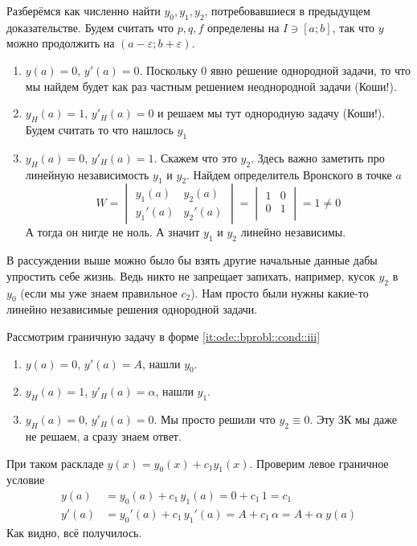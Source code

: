 \documentclass{trlnotes}
\begin{document}
Разберёмся как численно найти $y_0, y_1, y_2$, потребовавшиеся в предыдущем доказательстве.
Будем считать что $p,q,f$ определены на $I \ni [a;b]$, так что $y$ можно продолжить 
на $(a-ε;b+ε)$. 
\begin{enumerate}
  \item $y(a) = 0$, $y'(a) = 0$. Поскольку $0$ явно решение однородной задачи, то что мы
    найдем будет как раз частным решением неоднородной задачи (Коши!).
  \item $y_H(a) = 1$, $y'_H(a) = 0$ и решаем мы тут однородную задачу (Коши!). Будем считать то что
    нашлось $y_1$
  \item $y_H(a) = 0$, $y'_H(a) = 1$. Скажем что это $y_2$. Здесь важно заметить про линейную
    независимость $y_1$ и $y_2$. Найдем определитель Вронского в точке $a$
    \[
      W = \begin{vmatrix}
        y_1(a) & y_2(a) \\
        y_1'(a) & y_2'(a) 
      \end{vmatrix} = 
      \begin{vmatrix}
        1 & 0 \\ 
        0 & 1 \\
      \end{vmatrix} = 1 \neq 0
    \]
    А тогда он нигде не ноль. А значит $y_1$ и $y_2$ линейно независимы.
\end{enumerate}

В рассуждении выше можно было бы взять другие начальные данные дабы
упростить себе жизнь. Ведь никто не запрещает запихать, например, кусок $y_2$ в $y_0$
(если мы уже знаем правильное $c_2$). Нам просто были нужны какие-то линейно независимые
решения однородной задачи.

Рассмотрим граничную задачу в форме \ref{it:ode::bprobl::cond::iii}
\begin{enumerate}
  \item $y(a) = 0$, $y'(a) = A$, нашли  $y_0$.
  \item $y_H(a) = 1$, $y'_H(a) = α$, нашли $y_1$.
  \item $y_H(a) = 0$, $y'_H(a) = 0$. Мы просто решили что $y_2 \equiv 0$. Эту ЗК мы даже
    не решаем, а сразу знаем ответ.
\end{enumerate}
При таком раскладе $y(x) = y_0(x) + c_1 y_1(x)$. 
Проверим левое граничное условие 
\[
  \begin{split}
    y(a) &= y_0(a) + c_1\, y_1(a) = 0 + c_1 \, 1 = c_1 \\
    y'(a) &= y_0'(a) + c_1\, y_1'(a) = A + c_1 \, α = A + α\ y(a)
  \end{split}
\]
Как видно, всё получилось.
\end{document}
